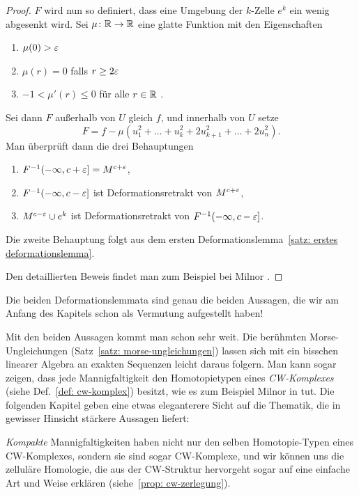 \begin{proof}
    $F$ wird nun so definiert, dass eine Umgebung der $k$-Zelle $e^k$ ein wenig abgesenkt wird.
    Sei $\mu \colon { \mathbb R } \to { \mathbb R }$ eine glatte Funktion mit den Eigenschaften
    \begin{enumerate}
        \item $\mu(0) > \varepsilon$
        \item $\mu (r) = 0$ falls $r \geq 2 \varepsilon$
        \item $-1 < \mu' (r) \leq 0$ für alle $r \in { \mathbb R }$ .
    \end{enumerate}
    Sei dann $F$ außerhalb von $U$ gleich $f$, und innerhalb von $U$ setze
    \[ F = f - \mu ( u_1^2 + \dots + u_k^2 + 2 u_{k + 1}^2 + \dots + 2 u_n^2) . \]
    Man überprüft dann die drei Behauptungen
    \begin{enumerate}
        \item $F^{-1}(- \infty, c + \varepsilon] = M^{c + \varepsilon}$,
        \item $F^{-1}(- \infty, c - \varepsilon]$ ist Deformationsretrakt von $M^{c + \varepsilon}$,
        \item $M^{c - \varepsilon} \cup e^k$ ist Deformationsretrakt von $F^{-1}(- \infty, c - \varepsilon]$.
    \end{enumerate}
    Die zweite Behauptung folgt aus dem ersten 
    Deformationslemma~\ref{satz: erstes deformationslemma}.
    
    Den detaillierten Beweis findet man zum Beispiel bei Milnor \cite{milnor}.
\end{proof}

Die beiden Deformationslemmata sind genau die beiden Aussagen, die wir am Anfang des Kapitels schon
als Vermutung aufgestellt haben!

Mit den beiden Aussagen kommt man schon sehr weit. Die berühmten Morse-\\Ungleichungen 
(Satz~\ref{satz: morse-ungleichungen}) lassen
sich mit ein bisschen linearer Algebra an exakten Sequenzen leicht daraus folgern. Man kann sogar
zeigen, dass jede Mannigfaltigkeit den Homotopietypen eines \textit{CW-Komplexes}
(siehe Def.~\ref{def: cw-komplex}) besitzt, wie es zum Beispiel Milnor  in \cite{milnor} tut. Die 
folgenden Kapitel geben eine etwas eleganterere Sicht auf die Thematik, die in gewisser Hinsicht 
stärkere Aussagen liefert:

\textit{Kompakte} Mannigfaltigkeiten haben nicht nur den selben Homotopie-Typen eines CW-Komplexes, 
sondern sie sind sogar CW-Komplexe, und wir können uns die zelluläre Homologie, die aus der 
CW-Struktur hervorgeht sogar auf eine einfache Art und Weise erklären 
(siehe~\ref{prop: cw-zerlegung}).